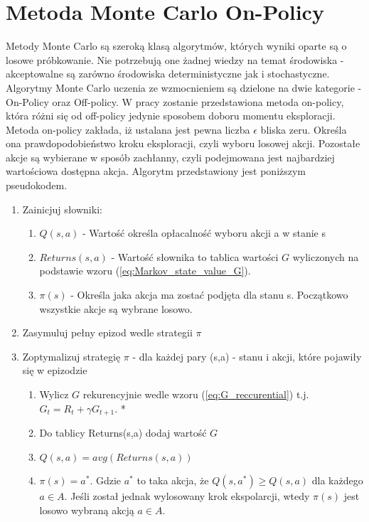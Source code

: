 \documentclass[12pt]{book}
\theoremstyle{plain}
\begin{document}
\section{Metoda Monte Carlo On-Policy}
Metody Monte Carlo są szeroką klasą algorytmów, których wyniki oparte są o losowe próbkowanie. Nie potrzebują one żadnej wiedzy na temat środowiska - akceptowalne są zarówno środowiska deterministyczne jak i stochastyczne. Algorytmy Monte Carlo uczenia ze wzmocnieniem są dzielone na dwie kategorie - On-Policy oraz Off-policy. W pracy zostanie przedstawiona metoda on-policy, która różni się od off-policy jedynie sposobem doboru momentu eksploracji. Metoda on-policy zakłada, iż ustalana jest pewna liczba $\epsilon$ bliska zeru. Określa ona prawdopodobieństwo kroku eksploracji, czyli wyboru losowej akcji. Pozostałe akcje są wybierane w sposób zachłanny, czyli podejmowana jest najbardziej wartościowa dostępna akcja. Algorytm przedstawiony jest poniższym pseudokodem.
\begin{enumerate}
	\item Zainicjuj słowniki:
	\begin{enumerate}
		\item $Q(s,a)$ - Wartość określa opłacalność wyboru akcji a w stanie s
		\item $Returns(s,a)$ - Wartość słownika to tablica wartości $G$ wyliczonych na podstawie wzoru (\ref{eq:Markov_state_value_G}).
		\item $\pi(s)$ - Określa jaka akcja ma zostać podjęta dla stanu s. Początkowo wszystkie akcje są wybrane losowo.
	\end{enumerate}
	\item Zasymuluj pełny epizod wedle strategii $\pi$
	\item Zoptymalizuj strategię $\pi$ - dla każdej pary (s,a) - stanu i akcji, które pojawiły się w epizodzie
	\begin{enumerate}
		\item Wylicz $G$ rekurencyjnie wedle wzoru (\ref{eq:G_reccurential}) t.j. $G_{t}=R_{t}+\gamma G_{t+1}$. *
		\item Do tablicy Returns(s,a) dodaj wartość $G$
		\item $Q(s,a)=avg(Returns(s,a))$
		\item $\pi(s)=a^*$. Gdzie $a^*$ to taka akcja, że $Q(s,a^*)\geq Q(s,a)$ dla każdego $a 
		\in A$. Jeśli został jednak wylosowany krok ekspolarcji, wtedy $\pi(s)$ jest losowo wybraną akcją $a \in A$.
	\end{enumerate}
\end{enumerate}
\end{document}
